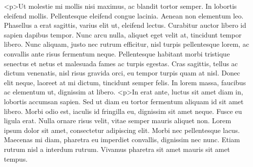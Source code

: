 \documentclass{article}
\begin{document}
{{<p>Ut molestie mi mollis nisi maximus, ac blandit tortor semper. In lobortis eleifend mollis. Pellentesque eleifend congue lacinia. Aenean non elementum leo. Phasellus a erat sagittis, varius elit ut, eleifend lectus. Curabitur auctor libero id sapien dapibus tempor. Nunc arcu nulla, aliquet eget velit at, tincidunt tempor libero. Nunc aliquam, justo nec rutrum efficitur, nisl turpis pellentesque lorem, ac convallis ante risus fermentum neque. Pellentesque habitant morbi tristique senectus et netus et malesuada fames ac turpis egestas. Cras sagittis, tellus ac dictum venenatis, nisl risus gravida orci, eu tempor turpis quam at nisl. Donec elit neque, laoreet at mi dictum, tincidunt semper felis. In lorem massa, faucibus ac elementum ut, dignissim at libero. 
<p>In erat ante, luctus sit amet diam in, lobortis accumsan sapien. Sed ut diam eu tortor fermentum aliquam id sit amet libero. Morbi odio est, iaculis id fringilla eu, dignissim sit amet neque. Fusce eu ligula erat. Nulla ornare risus velit, vitae semper mauris aliquet non. Lorem ipsum dolor sit amet, consectetur adipiscing elit. Morbi nec pellentesque lacus. Maecenas mi diam, pharetra eu imperdiet convallis, dignissim nec nunc. Etiam rutrum nisl a interdum rutrum. Vivamus pharetra sit amet mauris sit amet tempus. }}
\pend
\endnumbering
\end{document}

